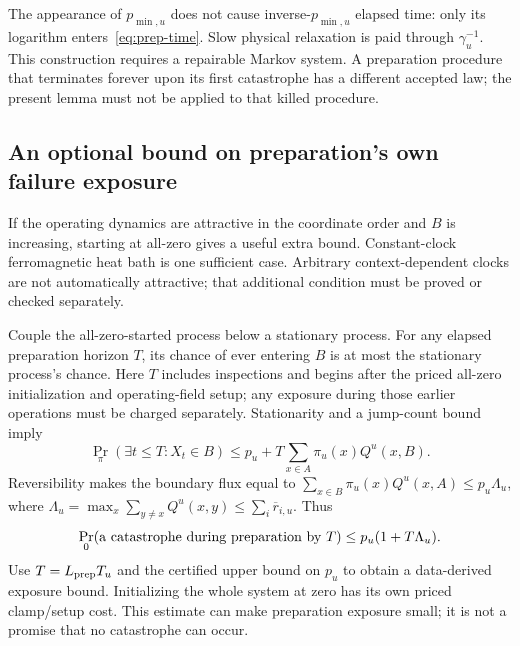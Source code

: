 \documentclass[11pt]{article}
\begin{document}
The appearance of $p_{\min,u}$ does not cause inverse-$p_{\min,u}$ elapsed time: only its logarithm enters~\eqref{eq:prep-time}. Slow physical relaxation is paid through $\gamma_u^{-1}$. This construction requires a repairable Markov system. A preparation procedure that terminates forever upon its first catastrophe has a different accepted law; the present lemma must not be applied to that killed procedure.

\subsection{An optional bound on preparation's own failure exposure}
If the operating dynamics are attractive in the coordinate order and $B$ is increasing, starting at all-zero gives a useful extra bound. Constant-clock ferromagnetic heat bath is one sufficient case. Arbitrary context-dependent clocks are not automatically attractive; that additional condition must be proved or checked separately.

Couple the all-zero-started process below a stationary process. For any elapsed preparation horizon $T$, its chance of ever entering $B$ is at most the stationary process's chance. Here $T$ includes inspections and begins after the priced all-zero initialization and operating-field setup; any exposure during those earlier operations must be charged separately. Stationarity and a jump-count bound imply
\[
 \Pr_\pi(\exists t\le T:X_t\in B)
 \le p_u+T\sum_{x\in A}\pi_u(x)Q^u(x,B).
\]
Reversibility makes the boundary flux equal to $\sum_{x\in B}\pi_u(x)Q^u(x,A)\le p_u\Lambda_u$, where $\Lambda_u=\max_x\sum_{y\ne x}Q^u(x,y)\le\sum_i\overline r_{i,u}$. Thus
\begin{equation}
 \Pr_0(\hbox{a catastrophe during preparation by }T)\le p_u(1+T\Lambda_u).
 \label{eq:prep-exposure}
\end{equation}
Use $T=L_{\rm prep}T_u$ and the certified upper bound on $p_u$ to obtain a data-derived exposure bound. Initializing the whole system at zero has its own priced clamp/setup cost. This estimate can make preparation exposure small; it is not a promise that no catastrophe can occur.
\end{document}

